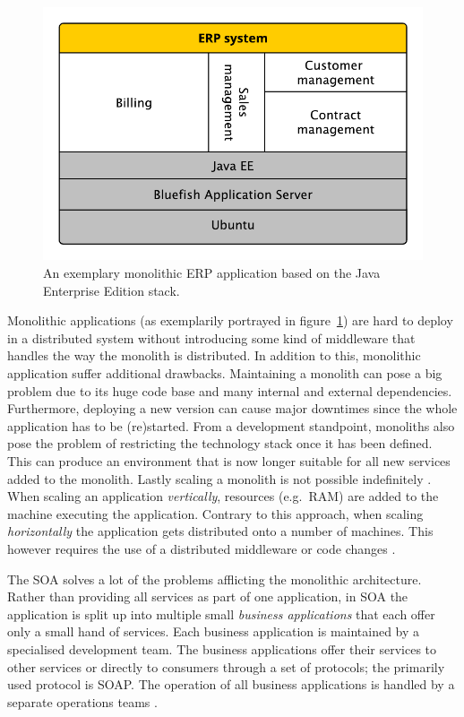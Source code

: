 \begin{figure}[H]
\begin{center}
  \includegraphics[scale=0.7]{images/figures/monolith_example.pdf}
\end{center}
\caption{An exemplary monolithic \ac{ERP} application based on the Java
Enterprise Edition stack.}%
\label{fig:monolith_example}
\end{figure}

Monolithic applications (as exemplarily portrayed in
figure~\ref{fig:monolith_example}) are hard to deploy in a distributed system
without introducing some kind of middleware that handles the way the monolith
is distributed. In addition to this, monolithic application suffer additional
drawbacks. Maintaining a monolith can pose a big problem due to its huge code
base and many internal and external dependencies. Furthermore, deploying a new
version can cause major downtimes since the whole application has to be
(re)started. From a development standpoint, monoliths also pose the problem of
restricting the technology stack once it has been defined. This can produce an
environment that is now longer suitable for all new services added to the
monolith. Lastly scaling a monolith is not possible indefinitely \autocite[p.
2]{DragoniMicroservicesyesterdaytoday2016}. When scaling an application
\textit{vertically}, resources (e.g.\ RAM) are added to the machine executing
the application. Contrary to this approach, when scaling \textit{horizontally}
the application gets distributed onto a number of machines. This however
requires the use of a distributed middleware or code changes \autocite[Ch.
1.1.1]{LuksaKubernetesAction2017}.

The \ac{SOA} solves a lot of the problems afflicting the monolithic
architecture. Rather than providing all services as part of one application, in
\ac{SOA} the application is split up into multiple small \textit{business
applications} that each offer only a small hand of services. Each business
application is maintained by a specialised development team. The business
applications offer their services to other services or directly to consumers
through a set of protocols; the primarily used protocol is \ac{SOAP}. The
operation of all business applications is handled by a separate operations
teams \autocite[p.  584]{VillamizarEvaluatingmonolithicmicroservice2015}.

